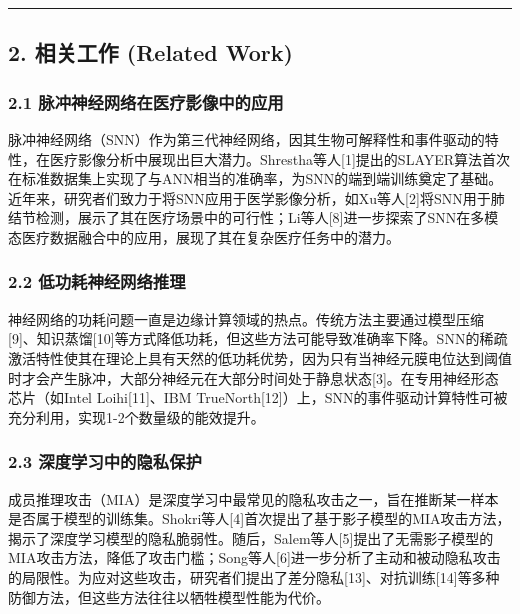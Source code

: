 \documentclass[
]{article}
\begin{document}
\begin{center}\rule{0.5\linewidth}{0.5pt}\end{center}

\subsection{2. 相关工作 (Related
Work)}\label{ux76f8ux5173ux5de5ux4f5c-related-work}

\subsubsection{2.1
脉冲神经网络在医疗影像中的应用}\label{ux8109ux51b2ux795eux7ecfux7f51ux7edcux5728ux533bux7597ux5f71ux50cfux4e2dux7684ux5e94ux7528}

脉冲神经网络（SNN）作为第三代神经网络，因其生物可解释性和事件驱动的特性，在医疗影像分析中展现出巨大潜力。Shrestha等人{[}1{]}提出的SLAYER算法首次在标准数据集上实现了与ANN相当的准确率，为SNN的端到端训练奠定了基础。近年来，研究者们致力于将SNN应用于医学影像分析，如Xu等人{[}2{]}将SNN用于肺结节检测，展示了其在医疗场景中的可行性；Li等人{[}8{]}进一步探索了SNN在多模态医疗数据融合中的应用，展现了其在复杂医疗任务中的潜力。

\subsubsection{2.2
低功耗神经网络推理}\label{ux4f4eux529fux8017ux795eux7ecfux7f51ux7edcux63a8ux7406}

神经网络的功耗问题一直是边缘计算领域的热点。传统方法主要通过模型压缩{[}9{]}、知识蒸馏{[}10{]}等方式降低功耗，但这些方法可能导致准确率下降。SNN的稀疏激活特性使其在理论上具有天然的低功耗优势，因为只有当神经元膜电位达到阈值时才会产生脉冲，大部分神经元在大部分时间处于静息状态{[}3{]}。在专用神经形态芯片（如Intel
Loihi{[}11{]}、IBM
TrueNorth{[}12{]}）上，SNN的事件驱动计算特性可被充分利用，实现1-2个数量级的能效提升。

\subsubsection{2.3
深度学习中的隐私保护}\label{ux6df1ux5ea6ux5b66ux4e60ux4e2dux7684ux9690ux79c1ux4fddux62a4}

成员推理攻击（MIA）是深度学习中最常见的隐私攻击之一，旨在推断某一样本是否属于模型的训练集。Shokri等人{[}4{]}首次提出了基于影子模型的MIA攻击方法，揭示了深度学习模型的隐私脆弱性。随后，Salem等人{[}5{]}提出了无需影子模型的MIA攻击方法，降低了攻击门槛；Song等人{[}6{]}进一步分析了主动和被动隐私攻击的局限性。为应对这些攻击，研究者们提出了差分隐私{[}13{]}、对抗训练{[}14{]}等多种防御方法，但这些方法往往以牺牲模型性能为代价。
\end{document}
